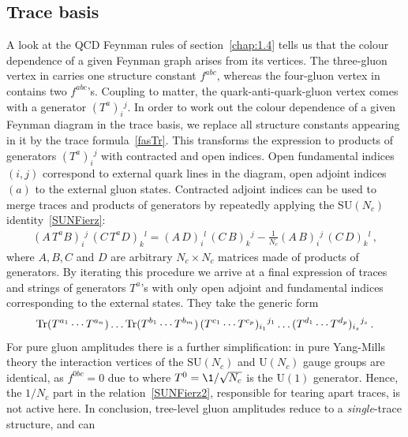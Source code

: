 \subsection{Trace basis}
\label{sec:trace_basis}

A look at the QCD Feynman rules of section~\ref{chap:1.4} tells us that the colour dependence of a given Feynman graph arises from its vertices. The three-gluon vertex in  carries one structure constant $f^{abc}$, whereas the four-gluon vertex in  contains 
two $f^{abc}$'s.
Coupling to matter, the quark-anti-quark-gluon
vertex  comes with a generator $(T^a)_i{}^{ j}$. 
In order to work out the colour dependence of a given Feynman diagram in the trace basis, we replace all structure constants appearing
in it by the trace formula~\eqref{fasTr}. 
This transforms the expression to products
of generators  $(T^{a})_{i}{}^{ j}$ with contracted and open indices. 
Open fundamental indices $(i, j)$ correspond to external quark lines in the diagram, open adjoint indices $(a)$
to the external gluon states.
Contracted adjoint indices can be used to merge traces and products of generators 
by repeatedly applying the $\text{SU}(N_{c})$ identity~\eqref{SUNFierz}:
\begin{align}
\label{SUNFierz2}
(A\, T^{a}  B)_{i}{}^{ j}\, 
(C\, T^{a}  D)_{k}{}^{ l}
= (A \, D)_{i}{}^{l}\, (C\, B)_{k}{}^{ j}
-\frac{1}{N_{c}} (A\, B)_{i}{}^{j}\, 
(C\, D)_{k}{}^{ l} \, ,
\end{align}
where $A, B,C$ and $D$ are arbitrary $N_{c}\times N_{c}$ matrices made of products of generators.
By iterating this procedure we arrive at a final expression of traces and strings 
of generators $T^a$'s with only open adjoint and fundamental indices corresponding to the external states.
They take the generic form
\begin{align}
\mathop{\mathrm{Tr}}(T^{a_{1}}\cdots T^{a_{n}})\ldots
\mathop{\mathrm{Tr}}(T^{b_{1}}\cdots T^{b_{m}})\, (T^{c_{1}}
\cdots T^{c_{p}})_{i_{1}}{}^{ j_{1}}
\ldots
 (T^{d_{1}} \cdots
T^{d_{p}})_{i_{s}}{}^{j_{s}}\, .
\end{align}
For pure gluon amplitudes there is a further simplification: in pure Yang-Mills theory the interaction
vertices of the $\text{SU}(N_{c})$ and $\text{U}(N_{c})$ gauge groups are identical, as $f^{0bc}\!=\!0$ due to 
where 
$T^{0}= \1/\sqrt{N_{c}}$ is the $\text{U}(1)$ generator. Hence, the ${1}/{N_{c}}$ part in
the relation~\eqref{SUNFierz2}, responsible for tearing apart traces, is not active here.
In conclusion, tree-level gluon amplitudes reduce to a \emph{single}-trace structure, and can
